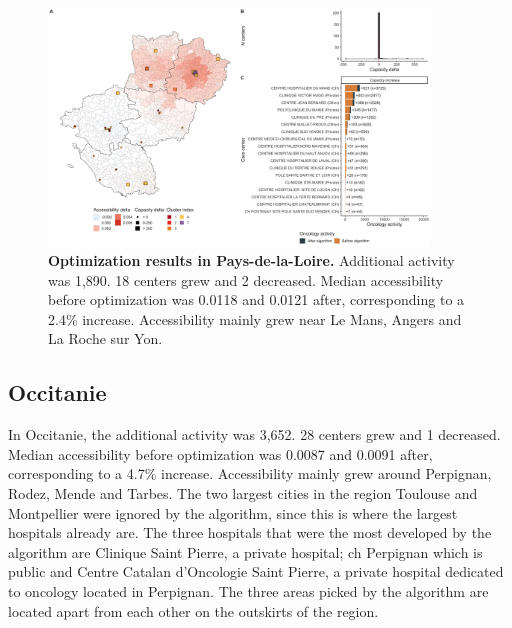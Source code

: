 \begin{figure}[H]
    \includegraphics[width=0.9\textwidth]{images/camion/optim_region/optim_Pays-de-la-Loire.png}
    \centering
    \caption{ \textbf{Optimization results in Pays-de-la-Loire.} Additional
        activity was 1,890. 18 centers grew and 2 decreased. Median
        accessibility before optimization was 0.0118 and 0.0121 after,
        corresponding to a 2.4\% increase. Accessibility mainly grew near Le
        Mans, Angers and La Roche sur Yon. }
\end{figure}

\subsection*{Occitanie}

In Occitanie, the additional activity was 3,652. 28 centers grew and 1
decreased. Median accessibility before optimization was 0.0087 and 0.0091 after,
corresponding to a 4.7\% increase. Accessibility mainly grew around Perpignan,
Rodez, Mende and Tarbes. The two largest cities in the region Toulouse and
Montpellier were ignored by the algorithm, since this is where the largest
hospitals already are. The three hospitals that were the most developed by the
algorithm are Clinique Saint Pierre, a private hospital; \ac{ch} Perpignan
which is public and Centre Catalan d'Oncologie Saint Pierre, a private
hospital dedicated to oncology located in Perpignan. The three areas picked
by the algorithm are located apart from each other on the outskirts
of the region.

